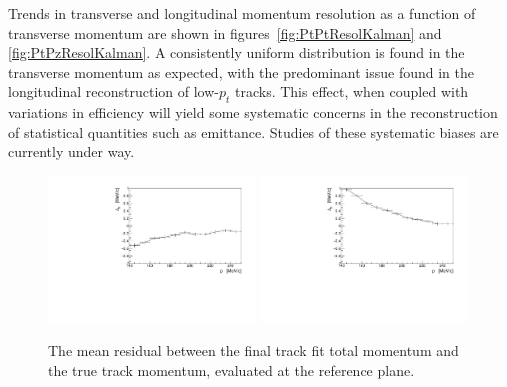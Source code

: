   Trends in transverse and longitudinal momentum resolution as a function of transverse momentum are shown in figures~\ref{fig:PtPtResolKalman} and \ref{fig:PtPzResolKalman}. A consistently uniform distribution is found in the transverse momentum as expected, with the predominant issue found in the longitudinal reconstruction of low-$p_t$ tracks. This effect, when coupled with variations in efficiency will yield some systematic concerns in the reconstruction of statistical quantities such as emittance. Studies of these systematic biases are currently under way.

  \begin{figure}[hb]
    \begin{center}
      \includegraphics[width=0.49\textwidth, angle=0]{08-Performance/upstream_p_bias_p.pdf}
      \includegraphics[width=0.49\textwidth, angle=0]{08-Performance/downstream_p_bias_p.pdf}
      \caption{\label{fig:pBiasKalman} The mean residual between the final track fit total momentum and the true track momentum, evaluated at the reference plane.}
    \end{center}
  \end{figure}

